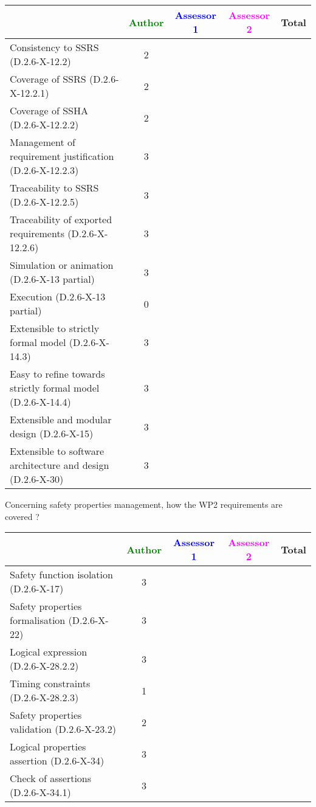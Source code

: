\begin{tabular}{|l | c | c | c | c|}
\hline
& \textcolor{green}{Author} & \textcolor{blue}{Assessor 1} & \textcolor{magenta}{Assessor 2} & Total \\
\hline 
Consistency to SSRS (D.2.6-X-12.2) & 2 & & &  \\
\hline
Coverage of SSRS (D.2.6-X-12.2.1)  & 2 & & &  \\
\hline
Coverage of SSHA (D.2.6-X-12.2.2)  & 2 & & &  \\
\hline
Management of requirement justification (D.2.6-X-12.2.3)  & 3 & & &  \\
\hline
Traceability to  SSRS (D.2.6-X-12.2.5)  & 3 & & &  \\
\hline
Traceability of exported requirements (D.2.6-X-12.2.6)  & 3 & & &  \\
\hline
Simulation or animation (D.2.6-X-13 partial)  & 3 & & &  \\
\hline
Execution (D.2.6-X-13 partial)  & 0 & & &  \\
\hline
Extensible to strictly formal model (D.2.6-X-14.3) & 3 & & &  \\
\hline
Easy to  refine towards strictly formal model (D.2.6-X-14.4) & 3 & & &  \\
\hline
Extensible and modular design (D.2.6-X-15)  & 3 & & &  \\
\hline
Extensible to software architecture and design (D.2.6-X-30)   & 3 & & &  \\
\hline
\end{tabular}

Concerning safety properties management, how the WP2 requirements are covered ?

\begin{tabular}{|l | c | c | c | c|}
\hline
& \textcolor{green}{Author} & \textcolor{blue}{Assessor 1} & \textcolor{magenta}{Assessor 2} & Total \\
\hline 
Safety function isolation (D.2.6-X-17)  & 3 & & &  \\
\hline 
Safety properties formalisation (D.2.6-X-22)  & 3 & & &  \\
\hline
Logical expression (D.2.6-X-28.2.2)  & 3 & & &  \\
\hline
Timing constraints (D.2.6-X-28.2.3)  & 1 & & &  \\
\hline
Safety properties validation (D.2.6-X-23.2)  & 2 & & &  \\
\hline
Logical properties assertion (D.2.6-X-34)  & 3 & & &  \\
\hline
Check  of assertions (D.2.6-X-34.1)  & 3 & & &  \\
\hline
\end{tabular}

